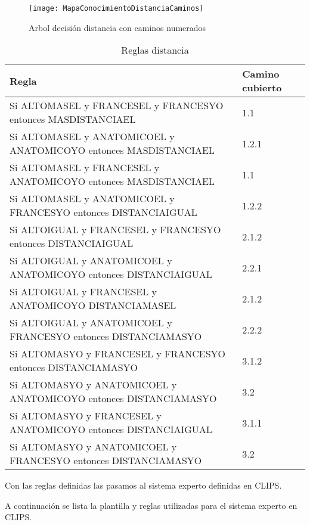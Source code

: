 \begin{figure}[htb]
  \centering
    \texttt{[image: MapaConocimientoDistanciaCaminos]}
  \caption[Arbol decisión distancia con caminos numerados]{Arbol decisión distancia con caminos numerados}
  \label{fig:Arbol decisión distancia con caminos numerados}
\end{figure}

\begin{table}[]
  \centering
  \caption{Reglas distancia}
  \label{tab:Reglas distancia}
  \begin{tabular}{|ll|}
    \hline
    Regla & Camino cubierto \\ \hline
    Si ALTOMASEL y FRANCESEL y FRANCESYO entonces MASDISTANCIAEL & 1.1 \\
    Si ALTOMASEL y ANATOMICOEL y ANATOMICOYO entonces MASDISTANCIAEL & 1.2.1 \\
    Si ALTOMASEL y FRANCESEL y ANATOMICOYO entonces MASDISTANCIAEL & 1.1 \\
    Si ALTOMASEL y ANATOMICOEL y FRANCESYO entonces DISTANCIAIGUAL & 1.2.2 \\
    Si ALTOIGUAL y FRANCESEL y FRANCESYO entonces DISTANCIAIGUAL & 2.1.2 \\
    Si ALTOIGUAL y ANATOMICOEL y ANATOMICOYO entonces DISTANCIAIGUAL & 2.2.1 \\
    Si ALTOIGUAL y FRANCESEL y ANATOMICOYO DISTANCIAMASEL & 2.1.2 \\
    Si ALTOIGUAL y ANATOMICOEL y FRANCESYO entonces DISTANCIAMASYO & 2.2.2 \\
    Si ALTOMASYO y FRANCESEL y FRANCESYO entonces DISTANCIAMASYO & 3.1.2 \\
    Si ALTOMASYO y ANATOMICOEL y ANATOMICOYO entonces DISTANCIAMASYO & 3.2 \\
    Si ALTOMASYO y FRANCESEL y ANATOMICOYO entonces DISTANCIAIGUAL & 3.1.1 \\
    Si ALTOMASYO y ANATOMICOEL y FRANCESYO entonces DISTANCIAMASYO & 3.2 \\ \hline
  \end{tabular}
\end{table}

Con las reglas definidas las pasamos al sistema experto definidas en CLIPS.

A continuación se lista la plantilla y reglas utilizadas para el sistema experto en CLIPS.


